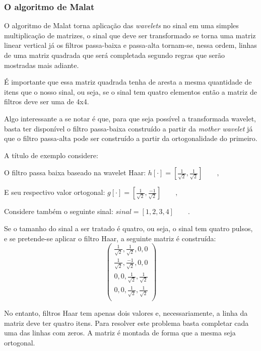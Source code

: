 \begin{myenv}{1.5}
			\subsubsection{O algoritmo de Malat}
			\par O algoritmo de Malat torna aplicação das \textit{wavelets} no sinal em uma simples multiplicação de matrizes, o sinal que deve ser transformado se torna uma matriz linear vertical já os filtros passa-baixa e passa-alta tornam-se, nessa ordem, linhas de uma matriz quadrada que será completada segundo regras que serão mostradas mais adiante.
			\par É importante que essa matriz quadrada tenha de aresta a mesma quantidade de itens que o nosso sinal, ou seja, se o sinal tem quatro elementos então a matriz de filtros deve ser uma de 4x4.
			\par Algo interessante a se notar é que, para que seja possível a transformada wavelet, basta ter disponível o filtro passa-baixa construído a partir da \textit{mother wavelet} já que o filtro passa-alta pode ser construído a partir da ortogonalidade do primeiro.
			\par A título de exemplo considere:
			\par O filtro passa baixa baseado na wavelet Haar:
			$h[\cdot] = [\frac{1}{\sqrt{2}}, \frac{1}{\sqrt{2}}]\qquad,$
			
			\par E seu respectivo valor ortogonal:
			$g[\cdot] = [\frac{1}{\sqrt{2}}, \frac{-1}{\sqrt{2}}]\qquad,$
			
			\par Considere também o seguinte sinal:	$sinal = [1,2,3,4]\qquad.$

			\par Se o tamanho do sinal a ser tratado é quatro, ou seja, o sinal tem quatro pulsos, e se pretende-se aplicar o filtro Haar, a seguinte matriz é construída:
			\begin{equation}
				\begin{pmatrix}
					\frac{1}{\sqrt{2}}, \frac{1}{\sqrt{2}}, 0, 0\\
					\frac{1}{\sqrt{2}}, \frac{-1}{\sqrt{2}}, 0, 0\\
					0, 0, \frac{1}{\sqrt{2}}, \frac{1}{\sqrt{2}}\\
					0, 0, \frac{1}{\sqrt{2}}, \frac{1}{\sqrt{2}}\\
				\end{pmatrix} 
			\end{equation}
			\par No entanto, filtros Haar tem apenas dois valores e, necessariamente, a linha da matriz deve ter quatro itens. Para resolver este problema basta completar cada uma das linhas com zeros. A matriz é montada de forma que a mesma seja ortogonal.


\end{myenv}
